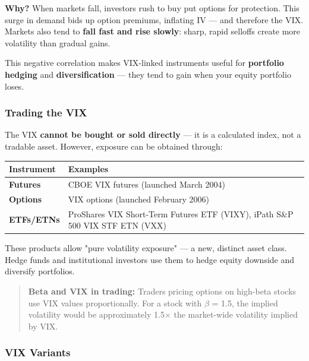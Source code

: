 \documentclass[12pt,openany]{book}
\begin{document}
\textbf{Why?} When markets fall, investors rush to buy put options for protection. This surge in demand bids up option premiums, inflating IV — and therefore the VIX. Markets also tend to \textbf{fall fast and rise slowly}: sharp, rapid selloffs create more volatility than gradual gains.

This negative correlation makes VIX-linked instruments useful for \textbf{portfolio hedging} and \textbf{diversification} — they tend to gain when your equity portfolio loses.

\subsubsection{Trading the VIX}

The VIX \textbf{cannot be bought or sold directly} — it is a calculated index, not a tradable asset. However, exposure can be obtained through:

\begin{center}
\scriptsize
\setlength{\tabcolsep}{3pt}
\begin{tabular}{|L{6.3cm}|L{6.3cm}|}
\hline
\textbf{Instrument} & \textbf{Examples} \\
\hline
\textbf{Futures} & CBOE VIX futures (launched March 2004) \\
\hline
\textbf{Options} & VIX options (launched February 2006) \\
\hline
\textbf{ETFs/ETNs} & ProShares VIX Short-Term Futures ETF (VIXY), iPath S\&P 500 VIX STF ETN (VXX) \\
\hline
\end{tabular}
\end{center}

These products allow "pure volatility exposure" — a new, distinct asset class. Hedge funds and institutional investors use them to hedge equity downside and diversify portfolios.

\begin{quote}
\textbf{Beta and VIX in trading:} Traders pricing options on high-beta stocks use VIX values proportionally. For a stock with \(\beta\) = 1.5, the implied volatility would be approximately 1.5\(\times\) the market-wide volatility implied by VIX.
\end{quote}

\subsubsection{VIX Variants}
\end{document}
